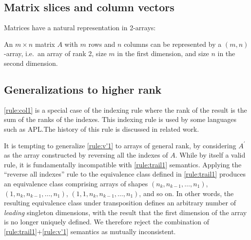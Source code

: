 \subsection{Matrix slices and column vectors}

Matrices have a natural representation in 2-arrays:

An $m \times n$ matrix $A$ with $m$ rows and $n$ columns can be
	represented by a $(m,n)$-array, i.e.\ an array of rank 2, size $m$ in
	the first dimension, and size $n$ in the second
	dimension.\label{rule:mat}



\subsection{Generalizations to higher rank}

\ref{rule:col1} is a special case of the indexing rule where the rank of the
result is the sum of the ranks of the indexes. This indexing rule is used by
some languages such as APL.\@ The history of this rule is discussed in
related work.

It is tempting to generalize \ref{rule:v'1} to arrays of general rank, by
considering $A^\prime$ as the array constructed by reversing all the indexes of
$A$. While by itself a valid rule, it is fundamentally incompatible with
\ref{rule:trail1} semantics. Applying the ``reverse all indexes'' rule to the
equivalence class defined in \ref{rule:trail1} produces an equivalence class
comprising arrays of shapes $(n_k, n_{k-1}, \dots, n_1)$, $(1, n_k, n_{k-1},
\dots, n_1)$, $(1, 1, n_k, n_{k-1}, \dots, n_1)$, and so on. In other words,
the resulting equivalence class under transposition defines an arbitrary number
of \textit{leading} singleton dimensions, with the result that the first
dimension of the array is no longer uniquely defined. We therefore reject the
combination of \ref{rule:trail1}+\ref{rule:v'1} semantics as mutually
inconsistent.



